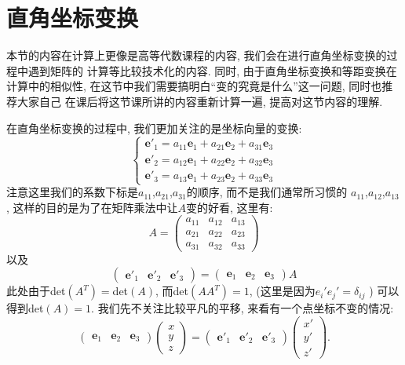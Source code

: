 \documentclass[./main.tex]{subfiles}
\begin{document}
\section{直角坐标变换}\label{3.3}

本节的内容在计算上更像是高等代数课程的内容, 我们会在进行直角坐标变换的过程中遇到矩阵的
计算等比较技术化的内容. 同时, 由于直角坐标变换和等距变换在计算中的相似性, 在这节中我们需要搞明白``变的究竟是什么''这一问题, 同时也推荐大家自己
在课后将这节课所讲的内容重新计算一遍, 提高对这节内容的理解.

在直角坐标变换的过程中, 我们更加关注的是坐标向量的变换: 
\[
\begin{cases}
    \mathbf{e}'_1=a_{11}\mathbf{e}_1+a_{21}\mathbf{e}_2+a_{31}\mathbf{e}_3\\

    \mathbf{e}'_2=a_{12}\mathbf{e}_1+a_{22}\mathbf{e}_2+a_{32}\mathbf{e}_3\\

    \mathbf{e}'_3=a_{13}\mathbf{e}_1+a_{23}\mathbf{e}_2+a_{33}\mathbf{e}_3
\end{cases}
\]
注意这里我们的系数下标是$a_{11}$,$a_{21}$,$a_{31}$的顺序, 而不是我们通常所习惯的
$a_{11}$,$a_{12}$,$a_{13}$, 这样的目的是为了在矩阵乘法中让$A$变的好看, 这里有:
\[A=
\begin{pmatrix}
a_{11}&a_{12}&a_{13}\\
a_{21}&a_{22}&a_{23}\\
a_{31}&a_{32}&a_{33}
\end{pmatrix}\]
以及
\begin{equation}
    \begin{pmatrix}\mathbf{e}'_1&\mathbf{e}'_2&\mathbf{e}'_3\end{pmatrix}=\begin{pmatrix}\mathbf{e}_1&\mathbf{e}_2&\mathbf{e}_3\end{pmatrix}A\label{坐标变换}
\end{equation}
此处由于det$(A^T)=$det$(A)$, 而det$(AA^T)=1$, (这里是因为$e_i'e_j'=\delta_{ij}$
) 可以得到det$(A)=1$. 
我们先不关注比较平凡的平移, 来看有一个点坐标不变的情况: 
\[
    \begin{pmatrix}\mathbf{e}_1&\mathbf{e}_2&\mathbf{e}_3\end{pmatrix}
\begin{pmatrix}
     x  \\
      y\\
      z
\end{pmatrix}
=
    \begin{pmatrix}\mathbf{e}'_1&\mathbf{e}'_2&\mathbf{e}'_3\end{pmatrix}
\begin{pmatrix}
     x'  \\
      y'\\
      z'
\end{pmatrix}.
\]
\end{document}
